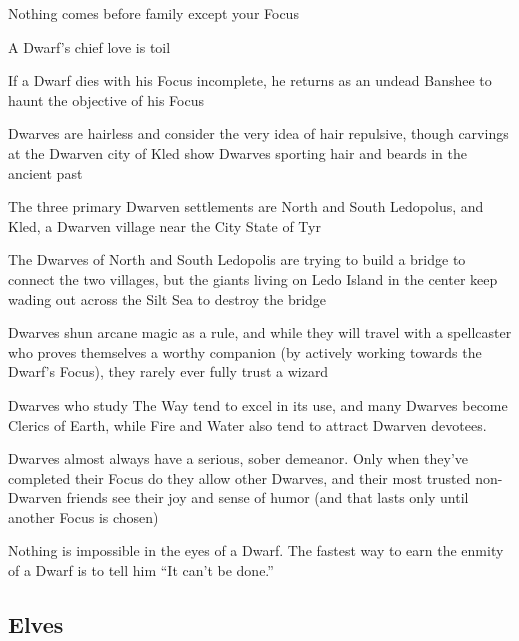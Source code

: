 \begin{description}
    \item Nothing comes before family except your Focus
    \item A Dwarf’s chief love is toil
    \item If a Dwarf dies with his Focus incomplete, he returns as an undead Banshee to haunt the objective of his Focus
    \item Dwarves are hairless and consider the very idea of hair repulsive, though carvings at the Dwarven city of Kled show Dwarves sporting hair and beards in the ancient past
    \item The three primary Dwarven settlements are North and South Ledopolus, and Kled, a Dwarven village near the City State of Tyr
    \item The Dwarves of North and South Ledopolis are trying to build a bridge to connect the two villages, but the giants living on Ledo Island in the center keep wading out across the Silt Sea to destroy the bridge
    \item Dwarves shun arcane magic as a rule, and while they will travel with a spellcaster who proves themselves a worthy companion (by actively working towards the Dwarf’s Focus), they rarely ever fully trust a wizard
    \item Dwarves who study The Way tend to excel in its use, and many Dwarves become Clerics of Earth, while Fire and Water also tend to attract Dwarven devotees.
    \item Dwarves almost always have a serious, sober demeanor. Only when they’ve completed their Focus do they allow other Dwarves, and their most trusted non-Dwarven friends see their joy and sense of humor (and that lasts only until another Focus is chosen)
    \item Nothing is impossible in the eyes of a Dwarf. The fastest way to earn the enmity of a Dwarf is to tell him “It can’t be done.”
\end{description}

\subsection{Elves}

